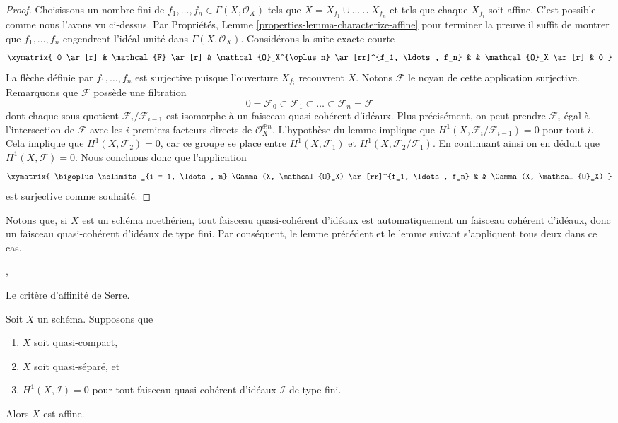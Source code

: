 \begin{proof}
\medskip\noindent
Choisissons un nombre fini de $f_1, \ldots, f_n \in \Gamma(X, \mathcal{O}_X)$
tels que $X = X_{f_1} \cup \ldots \cup X_{f_n}$ et tels que chaque $X_{f_i}$
soit affine. C'est possible comme nous l'avons vu ci-dessus. Par Propriétés,
Lemme \ref{properties-lemma-characterize-affine} pour terminer la preuve il
suffit de montrer que $f_1, \ldots, f_n$ engendrent l'idéal unité dans
$\Gamma(X, \mathcal{O}_X)$. Considérons la suite exacte courte
$$
\xymatrix{
0 \ar[r] &
\mathcal{F} \ar[r] &
\mathcal{O}_X^{\oplus n} \ar[rr]^{f_1, \ldots, f_n} & &
\mathcal{O}_X \ar[r] &
0
}
$$
La flèche définie par $f_1, \ldots, f_n$ est surjective puisque l'ouverture
$X_{f_i}$ recouvrent $X$. Notons $\mathcal{F}$ le noyau de cette application
surjective. Remarquons que $\mathcal{F}$ possède une filtration
$$
0 = \mathcal{F}_0 \subset \mathcal{F}_1 \subset
\ldots \subset \mathcal{F}_n = \mathcal{F}
$$
dont chaque sous-quotient $\mathcal{F}_i/\mathcal{F}_{i - 1}$ est isomorphe à
un faisceau quasi-cohérent d'idéaux. Plus précisément, on peut prendre
$\mathcal{F}_i$ égal à l'intersection de $\mathcal{F}$ avec les $i$ premiers
facteurs directs de $\mathcal{O}_X^{\oplus n}$. L'hypothèse du
lemme implique que $H^1(X, \mathcal{F}_i/\mathcal{F}_{i - 1}) = 0$ pour tout
$i$. Cela implique que $H^1(X, \mathcal{F}_2) = 0$, car ce groupe se place
entre $H^1(X, \mathcal{F}_1)$ et $H^1(X, \mathcal{F}_2/\mathcal{F}_1)$. En
continuant ainsi on en déduit que $H^1(X, \mathcal{F}) = 0$. Nous concluons
donc que l'application
$$
\xymatrix{
\bigoplus\nolimits_{i = 1, \ldots, n} \Gamma(X, \mathcal{O}_X)
\ar[rr]^{f_1, \ldots, f_n} & &
\Gamma(X, \mathcal{O}_X)
}
$$
est surjective comme souhaité.
\end{proof}

\noindent
Notons que, si $X$ est un schéma noethérien, tout faisceau quasi-cohérent
d'idéaux est automatiquement un faisceau cohérent d'idéaux, donc un faisceau
quasi-cohérent d'idéaux de type fini. Par conséquent, le lemme
précédent et le lemme suivant s'appliquent tous deux dans ce cas.

\begin{lemma}
\label{lemma-quasi-separated-h1-zero-covering}
\begin{reference}
\cite{Serre-criterion}, \cite[II, Théorème 5.2.1]{EGA}
\end{reference}
\begin{slogan}
Le critère d'affinité de Serre.
\end{slogan}
Soit $X$ un schéma. Supposons que
\begin{enumerate}
\item $X$ soit quasi-compact, \item $X$ soit quasi-séparé, et \item
$H^1(X, \mathcal{I}) = 0$ pour tout faisceau quasi-cohérent d'idéaux
$\mathcal{I}$ de type fini.
\end{enumerate}
Alors $X$ est affine.
\end{lemma}

